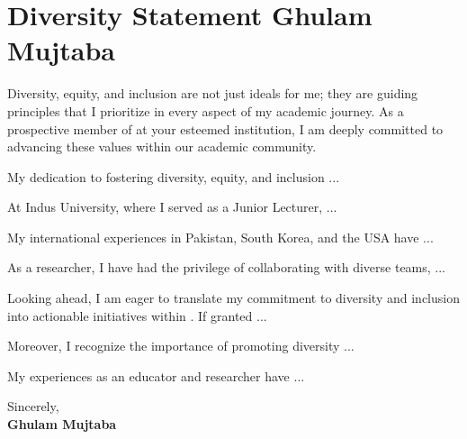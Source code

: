 \vspace{1.0cm}

\section*{\centering Diversity Statement \hfill Ghulam Mujtaba \hfill\hspace*{\fill}\monthYear}
\vspace*{5pt}

Diversity, equity, and inclusion are not just ideals for me; they are guiding principles that I prioritize in every aspect of my academic journey. As a prospective member of \department at your esteemed institution, I am deeply committed to advancing these values within our academic community.

\vspace*{5pt}

My dedication to fostering diversity, equity, and inclusion  ...

\vspace*{5pt}

At Indus University, where I served as a Junior Lecturer, ...

\vspace*{5pt}

My international experiences in Pakistan, South Korea, and the USA have  ...

\vspace*{5pt}

As a researcher, I have had the privilege of collaborating with diverse teams, ...

\vspace*{5pt}

Looking ahead, I am eager to translate my commitment to diversity and inclusion into actionable initiatives within \department. If granted ...

\vspace*{5pt}

Moreover, I recognize the importance of promoting diversity ...

\vspace*{5pt}

My experiences as an educator and researcher have ...


\vspace*{25pt}

Sincerely,\\
\textbf{Ghulam Mujtaba}
